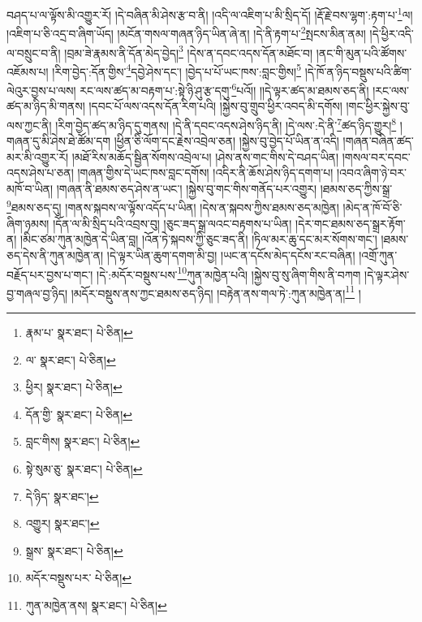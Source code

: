 བཤད་པ་ལ་ལྟོས་མི་འགྱུར་རོ། །དེ་བཞིན་མི་ཤེས་རྩ་བ་ནི། །འདི་ལ་འཇིག་པ་མི་སྲིད་དོ། །རྡོ་རྗེ་བས་ལྷག་:རྟག་པ་\footnote{རྣམ་པ་  སྣར་ཐང་།  པེ་ཅིན། }ལ། །འཇིག་པ་ཅི་འདྲ་བ་ཞིག་ཡོད། །མངོན་གསལ་གཞན་ཉིད་ཡིན་ཞེ་ན། །དེ་ནི་རྟག་པ་\footnote{ལ་  སྣར་ཐང་།  པེ་ཅིན། }སྤངས་མིན་ནམ། །དེ་ཕྱིར་འདི་ལ་བསྲུང་བ་ནི། །བྲམ་ཟེ་རྣམས་ནི་དོན་མེད་བྱེད།\footnote{ཕྱིར།  སྣར་ཐང་།  པེ་ཅིན། } །དེས་ན་དབང་འདས་དོན་མཐོང་བ། །ནང་གི་མུན་པའི་ཚོགས་འཇོམས་པ། །རིག་བྱེད་:དོན་གྱིས་\footnote{དོན་གྱི་  སྣར་ཐང་།  པེ་ཅིན། }དབྱེ་ཤེས་དང་། །བྱེད་པ་པོ་ཡང་ཁས་:བླང་གྱིས།\footnote{བླང་གིས།  སྣར་ཐང་།  པེ་ཅིན། } །དེ་ཁོ་ན་ཉིད་བསྡུས་པའི་ཚིག་ལེའུར་བྱས་པ་ལས། རང་ལས་ཚད་མ་བརྟག་པ་:སྟེ་ཉི་ཤུ་རྩ་དགུ་\footnote{སྟེ་སུམ་ཅུ་  སྣར་ཐང་།  པེ་ཅིན། }པའོ།། །།དེ་ལྟར་ཚད་མ་ཐམས་ཅད་ནི། །རང་ལས་ཚད་མ་ཉིད་མི་གནས། །དབང་པོ་ལས་འདས་དོན་རིག་པའི། །སྐྱེས་བུ་གྲུབ་ཕྱིར་འབད་མི་དགོས། །གང་ཕྱིར་སྐྱེས་བུ་ལས་ཀྱང་ནི། །རིག་བྱེད་ཚད་མ་ཉིད་དུ་གནས། །དེ་ནི་དབང་འདས་ཤེས་ཉིད་ནི། །དེ་ལས་:དེ་ནི་\footnote{དེ་ཉིད་  སྣར་ཐང་། }ཚད་ཉིད་གྱུར།\footnote{འགྱུར།  སྣར་ཐང་། } །གཞན་དུ་མི་ཤེས་ཐེ་ཚོམ་དག །ཕྱིན་ཅི་ལོག་དང་རྗེས་འབྲེལ་ཅན། །སྐྱེས་བུ་བྱེད་པོ་ཡིན་ན་འདི། །གཞན་བཞིན་ཚད་མར་མི་འགྱུར་རོ། །མཐོ་རིས་མཆོད་སྦྱིན་སོགས་འབྲེལ་པ། །ཤེས་ནས་གང་གིས་དེ་བཤད་ཡིན། །གསལ་བར་དབང་འདས་ཤེས་པ་ཅན། །གཞན་གྱིས་དེ་ཡང་ཁས་བླང་དགོས། །འདིར་ནི་ཆོས་ཤེས་ཉིད་དགག་པ། །འབའ་ཞིག་ཉེ་བར་མཁོ་བ་ཡིན། །གཞན་ནི་ཐམས་ཅད་ཤེས་ན་ཡང་། །སྐྱེས་བུ་གང་གིས་གནོད་པར་འགྱུར། །ཐམས་ཅད་ཀྱིས་སྒྲ་\footnote{སྒྲས་  སྣར་ཐང་།  པེ་ཅིན། }ཐམས་ཅད་དུ། །གནས་སྐབས་ལ་ལྟོས་འདོད་པ་ཡིན། །དེས་ན་སྐབས་ཀྱིས་ཐམས་ཅད་མཁྱེན། །མེད་ན་ཁོ་བོ་ཅི་ཞིག་ཉམས། །དོན་ལ་མི་སྲིད་པའི་འབྲས་བུ། །ཅུང་ཟད་སྒྲ་ལའང་བརྟགས་པ་ཡིན། །དེར་གང་ཐམས་ཅད་སྒྲར་རྟོག་ན། །མིང་ཙམ་ཀུན་མཁྱེན་དེ་ཡིན་བླ། །འོན་ཏེ་སྐབས་ཀྱི་ཅུང་ཟད་ནི། །ཏིལ་མར་ཆུ་དང་མར་སོགས་གང་། །ཐམས་ཅད་དེས་ནི་ཀུན་མཁྱེན་ན། །དེ་ལྟར་ཡིན་ཆུག་དགག་མི་བྱ། །ཡང་ན་དངོས་མེད་དངོས་རང་བཞིན། །འགྲོ་ཀུན་བརྗོད་པར་བྱས་པ་གང་། །དེ་:མདོར་བསྡུས་པས་\footnote{མདོར་བསྡུས་པར་  པེ་ཅིན། }ཀུན་མཁྱེན་པའི། །སྐྱེས་བུ་སུ་ཞིག་གིས་ནི་བཀག །དེ་ལྟར་ཤེས་བྱ་གཞལ་བྱ་ཉིད། །མདོར་བསྡུས་ནས་ཀྱང་ཐམས་ཅད་ཉིད། །བརྟེན་ནས་གལ་ཏེ་:ཀུན་མཁྱེན་ན།\footnote{ཀུན་མཁྱེན་ནས།  སྣར་ཐང་།  པེ་ཅིན། } །
